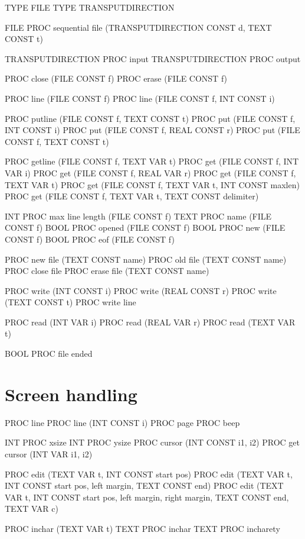 \begin{elan}
TYPE FILE
TYPE TRANSPUTDIRECTION

FILE PROC sequential file (TRANSPUTDIRECTION CONST d,
                           TEXT CONST t)

TRANSPUTDIRECTION PROC input
TRANSPUTDIRECTION PROC output

PROC close (FILE CONST f)
PROC erase (FILE CONST f)

PROC line (FILE CONST f)
PROC line (FILE CONST f, INT CONST i)

PROC putline (FILE CONST f, TEXT CONST t)
PROC put (FILE CONST f, INT CONST i)
PROC put (FILE CONST f, REAL CONST r)
PROC put (FILE CONST f, TEXT CONST t)

PROC getline (FILE CONST f, TEXT VAR t)
PROC get (FILE CONST f, INT VAR i)
PROC get (FILE CONST f, REAL VAR r)
PROC get (FILE CONST f, TEXT VAR t)
PROC get (FILE CONST f, TEXT VAR t, INT CONST maxlen)
PROC get (FILE CONST f, TEXT VAR t, TEXT CONST delimiter)

INT PROC max line length (FILE CONST f)
TEXT PROC name (FILE CONST f)
BOOL PROC opened (FILE CONST f)
BOOL PROC new (FILE CONST f)
BOOL PROC eof (FILE CONST f)

PROC new file (TEXT CONST name)
PROC old file (TEXT CONST name)
PROC close file
PROC erase file (TEXT CONST name)

PROC write (INT CONST i)
PROC write (REAL CONST r)
PROC write (TEXT CONST t)
PROC write line

PROC read (INT VAR i)
PROC read (REAL VAR r)
PROC read (TEXT VAR t)

BOOL PROC file ended
\end{elan}

\section{Screen handling}

\begin{elan}
PROC line
PROC line (INT CONST i)
PROC page
PROC beep

INT PROC xsize
INT PROC ysize
PROC cursor (INT CONST i1, i2)
PROC get cursor (INT VAR i1, i2)

PROC edit (TEXT VAR t, INT CONST start pos)
PROC edit (TEXT VAR t, INT CONST start pos, left margin,
           TEXT CONST end)
PROC edit (TEXT VAR t,
           INT CONST start pos, left margin, right margin,
           TEXT CONST end, TEXT VAR c)

PROC inchar (TEXT VAR t)
TEXT PROC inchar
TEXT PROC incharety
\end{elan}

